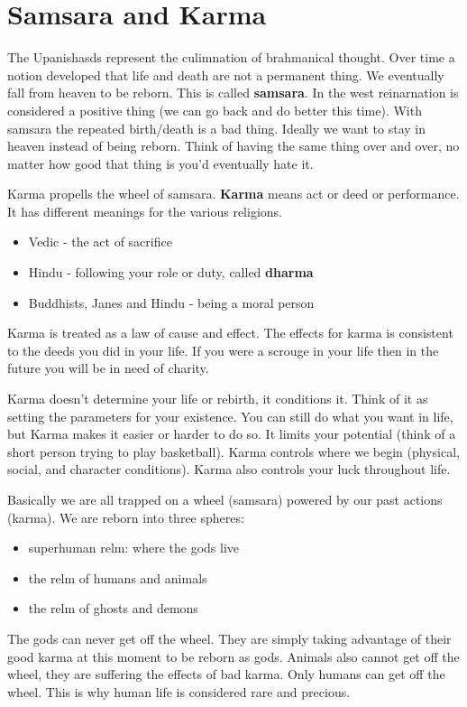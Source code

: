 \documentclass{article}
\begin{document}
\section*{Samsara and Karma}
\label{sec:samsara_and_karma}
The Upanishasds represent the culimnation of brahmanical thought. Over time a notion developed that life and death are not a permanent thing. We eventually fall from heaven to be reborn. This is called \textbf{samsara}. In the west reinarnation is considered a positive thing (we can go back and do better this time). With samsara the repeated birth/death is a bad thing. Ideally we want to stay in heaven instead of being reborn. Think of having the same thing over and over, no matter how good that thing is you'd eventually hate it.

Karma propells the wheel of samsara. \textbf{Karma} means act or deed or performance. It has different meanings for the various religions.
\begin{itemize}
	\item Vedic - the act of sacrifice
	\item Hindu - following your role or duty, called \textbf{dharma}
	\item Buddhists, Janes and Hindu - being a moral person
\end{itemize}

Karma is treated as a law of cause and effect. The effects for karma is consistent to the deeds you did in your life. If you were a scrouge in your life then in the future you will be in need of charity.

Karma doesn't determine your life or rebirth, it conditions it. Think of it as setting the parameters for your existence. You can still do what you want in life, but Karma makes it easier or harder to do so. It limits your potential (think of a short person trying to play basketball). Karma controls where we begin (physical, social, and character conditions). Karma also controls your luck throughout life.

Basically we are all trapped on a wheel (samsara) powered by our past actions (karma). We are reborn into three spheres:
\begin{itemize}
	\item superhuman relm: where the gods live
	\item the relm of humans and animals
	\item the relm of ghosts and demons
\end{itemize}

The gods can never get off the wheel. They are simply taking advantage of their good karma at this moment to be reborn as gods. Animals also cannot get off the wheel, they are suffering the effects of bad karma. Only humans can get off the wheel. This is why human life is considered rare and precious.
\end{document}
